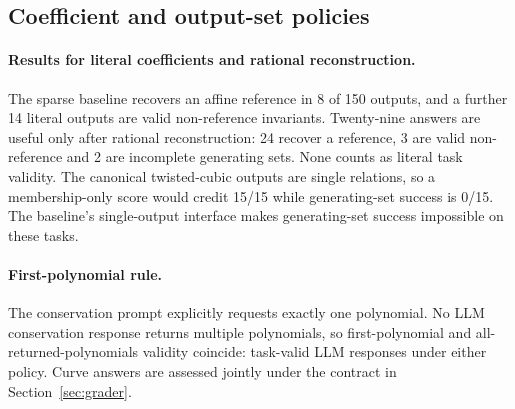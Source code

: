 \documentclass[10pt]{article}
\begin{document}
\subsection{Coefficient and output-set policies}

\paragraph{Results for literal coefficients and rational reconstruction.} The sparse baseline recovers an affine reference in 8 of 150 outputs, and a further 14 literal outputs are valid non-reference invariants. Twenty-nine answers are useful only after rational reconstruction: 24 recover a reference, 3 are valid non-reference and 2 are incomplete generating sets. None counts as literal task validity. The canonical twisted-cubic outputs are single relations, so a membership-only score would credit 15/15 while generating-set success is 0/15. The baseline's single-output interface makes generating-set success impossible on these tasks.

\begin{table}[!htbp]
\centering
\small
\setlength{\tabcolsep}{4pt}
\tabSINDy
\caption{Diagnostic sparse-nullspace baseline, condition B; counts out of 15 per row. Task-valid includes reference recovery and non-reference conserved quantities. Reconstructed answers are useful only after lossy reconstruction and are excluded from literal task validity; incomplete and trivial are literal verdicts. The five verdict columns are not disjoint because reference recovery is a subset of task-valid. The remaining outputs are algebraic failures (55 plausible and 25 implausible overall). Full verdict records and cap sensitivity are archived. Single-output twisted-cubic rows cannot satisfy the generating-set task by design.}
\label{tab:results-sindy}
\end{table}

\paragraph{First-polynomial rule.} The conservation prompt explicitly requests exactly one polynomial. No LLM conservation response returns multiple polynomials, so first-polynomial and all-returned-polynomials validity coincide: \nFirstValid{} task-valid LLM responses under either policy. Curve answers are assessed jointly under the contract in Section~\ref{sec:grader}.
\end{document}
